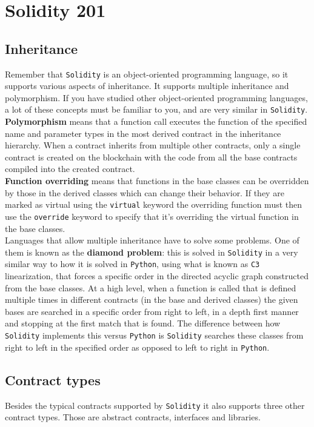 \chapter{Solidity 201}

\section{Inheritance}
Remember that \verb|Solidity| is an object-oriented programming language, so it supports various aspects of inheritance. It supports multiple inheritance and polymorphism. If you have studied other object-oriented programming languages, a lot of these concepts must be familiar to you, and are very similar in \verb|Solidity|.\\

\textbf{Polymorphism} means that a function call executes the function of the specified name and parameter types in the most derived contract in the inheritance hierarchy. When a contract inherits from multiple other contracts, only a single contract is created on the blockchain with the code from all the base contracts compiled into the created contract.\\

\textbf{Function overriding} means that functions in the base classes can be overridden by those in the derived classes which can change their behavior. If they are marked as virtual using the \verb|virtual| keyword the overriding function must then use the \verb|override| keyword to specify that it's overriding the virtual function in the base classes.\\

Languages that allow multiple inheritance have to solve some problems. One of them is known as the \textbf{diamond problem}: this is solved in \verb|Solidity| in a very similar way to how it is solved in  \verb|Python|, using what is known as \verb|C3| linearization, that forces a specific order in the directed acyclic graph constructed from the base classes. At a high level, when a function is called that is defined multiple times in different contracts (in the base and derived classes) the given bases are searched in a specific order from right to left, in a depth first manner and stopping at the first match that is found. The difference between how \verb|Solidity| implements this versus \verb|Python| is \verb|Solidity| searches these classes from right to left in the specified order as opposed to left to right in \verb|Python|.

\section{Contract types}
Besides the typical contracts supported by \verb|Solidity| it also supports three other contract types. Those are abstract contracts, interfaces and libraries.

